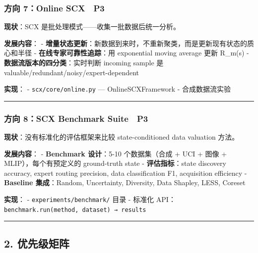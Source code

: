 \documentclass[
  12pt,
]{ctexart}
\begin{document}
\subsubsection{方向 7：Online SCX 🔵
P3}\label{ux65b9ux5411-7online-scx-p3}

\textbf{现状}：SCX 是批处理模式------收集一批数据后统一分析。

\textbf{发展内容}： -
\textbf{增量状态更新}：新数据到来时，不重新聚类，而是更新现有状态的质心和半径
- \textbf{在线专家可靠性追踪}：用 exponential moving average 更新
R\_m(s) - \textbf{数据流版本的四分类}：实时判断 incoming sample 是
valuable/redundant/noisy/expert-dependent

\textbf{实现}： - \texttt{scx/core/online.py} --- OnlineSCXFramework -
合成数据流实验

\begin{center}\rule{0.5\linewidth}{0.5pt}\end{center}

\subsubsection{方向 8：SCX Benchmark Suite 🔵
P3}\label{ux65b9ux5411-8scx-benchmark-suite-p3}

\textbf{现状}：没有标准化的评估框架来比较 state-conditioned data
valuation 方法。

\textbf{发展内容}： - \textbf{Benchmark 设计}：5-10 个数据集（合成 + UCI
+ 图像 + MLIP），每个有预定义的 ground-truth state -
\textbf{评估指标}：state discovery accuracy, expert routing precision,
data classification F1, acquisition efficiency - \textbf{Baseline
集成}：Random, Uncertainty, Diversity, Data Shapley, LESS, Coreset

\textbf{实现}： - \texttt{experiments/benchmark/} 目录 - 标准化
API：\texttt{benchmark.run(method,\ dataset)\ →\ results}

\begin{center}\rule{0.5\linewidth}{0.5pt}\end{center}

\subsection{2. 优先级矩阵}\label{ux4f18ux5148ux7ea7ux77e9ux9635}
\end{document}
